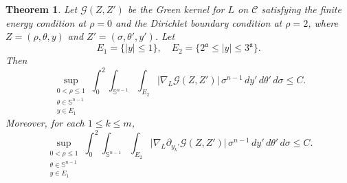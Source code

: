 \documentclass[12pt]{amsart}
\newtheorem{theorem}{Theorem}[section]
\begin{document}
\begin{theorem}\label{lem:Green_kernel}
Let $\mathcal{G}(Z,Z')$ be the Green kernel for $L$ on $\mathcal{C}$ satisfying the finite energy condition at $\rho=0$ and the Dirichlet boundary condition at $\rho=2$, where $Z=(\rho,\theta,y)$ and $Z' = (\sigma,\theta',y')$. Let
\begin{equation*}
    E_1 = \{|y|\le 1\},\quad E_2 = \bigl\{2^{\mathfrak a}\le |y| \le 3^{\mathfrak a} \bigr\}.
\end{equation*}
Then
\begin{equation}\label{1}
    \sup_{ \substack{0<\rho \le 1\\ \theta \in \mathbb{S}^{n-1}\\ y\in E_1}}   \int_0^2 \int_{\mathbb{S}^{n-1}} \int_{E_2} \bigl| \nabla_L \mathcal{G}(Z,Z') \bigr| \, \sigma^{n-1} \, dy' \, d\theta' \, d\sigma \le C.
\end{equation}
Moreover, for each $1\le k \le m$,
\begin{equation}\label{2}
    \sup_{ \substack{0<\rho \le 1\\ \theta \in \mathbb{S}^{n-1}\\ y\in E_1}}   \int_0^2 \int_{\mathbb{S}^{n-1}} \int_{E_2} \bigl| \nabla_L \partial_{y_k'} \mathcal{G}(Z,Z') \bigr| \, \sigma^{n-1} \, dy' \, d\theta' \, d\sigma \le C.
\end{equation}
\end{theorem}
\end{document}
